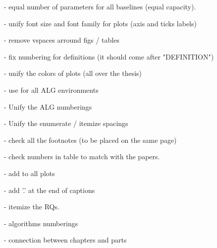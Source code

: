  - equal number of parameters for all baselines (equal capacity).

 - unify font size and font family for plots (axis and ticks labels)

 - remove vspaces arround figs / tables
 
 - fix numbering for definitions (it should come after "DEFINITION")
 
 - unify the colors of plots (all over the thesis)
 
 - use \small for all ALG environments
 
 - Unify the ALG numberings
 
 - Unify the enumerate / itemize spacings
 
 - check all the footnotes (to be placed on the same page)
 
 - check numbers in table to match with the papers.
 
 - add \selectfont to all plots
 
 - add '.' at the end of captions
 
 - itemize the RQs.
 
 - algorithms numberings
 
 - connection between chapters and parts
